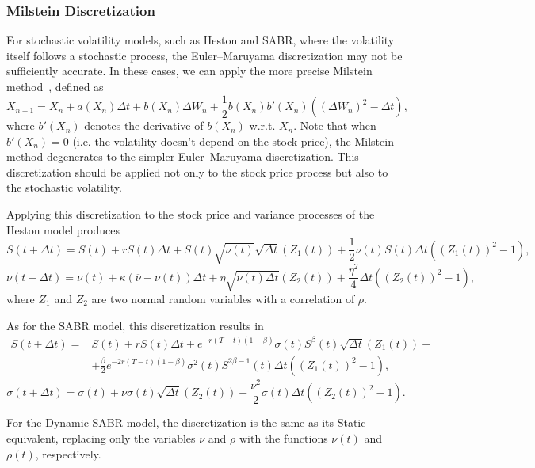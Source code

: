 \subsubsection{Milstein Discretization}
For stochastic volatility models, such as Heston and SABR, where the volatility itself follows a stochastic process, the Euler–Maruyama discretization may not be sufficiently accurate. In these cases, we can apply the more precise Milstein method~\citep{Milstein}, defined as
\begin{equation}
X_{n+1}=X_n+a(X_n)\Delta t+b(X_n)\Delta W_n+\frac{1}{2}b(X_n)b'(X_n)((\Delta W_n)^2-\Delta t),
\end{equation}
\noindent where $b'(X_n)$ denotes the derivative of $b(X_n)$ w.r.t. $X_n$. Note that when $b'(X_n)=0$ (i.e. the volatility doesn't depend on the stock price), the Milstein method degenerates to the simpler Euler–Maruyama discretization. This discretization should be applied not only to the stock price process but also to the stochastic volatility.

Applying this discretization to the stock price and variance processes of the Heston model produces
\begin{equation}\label{milsteinheston1}
S(t+\Delta t)=S(t)+rS(t)\Delta t+S(t)\sqrt{\nu(t)}\sqrt{\Delta t}(Z_1(t))+\frac{1}{2}\nu(t)S(t)\Delta t((Z_1(t))^2-1),
\end{equation}
\begin{equation}
\nu(t+\Delta t)=\nu(t)+\kappa(\overline{\nu}-\nu(t))\Delta t+\eta\sqrt{\nu(t)\Delta t}(Z_2(t))+\frac{\eta^2}{4}\Delta t((Z_2(t))^2-1),
\end{equation}
\noindent where $Z_1$ and $Z_2$ are two normal random variables with a correlation of $\rho$.


As for the SABR model, this discretization results in
\begin{equation}
\begin{split}
S(t+\Delta t)=&S(t)+rS(t)\Delta t+e^{-r(T-t)(1-\beta)}\sigma(t)S^\beta(t)\sqrt{\Delta t}(Z_1(t))+\\
&+\frac{\beta}{2}e^{-2r(T-t)(1-\beta)}\sigma^2(t)S^{2\beta-1}(t)\Delta t((Z_1(t))^2-1),
\end{split}
\end{equation}
\begin{equation}\label{milsteinsabr2}
\sigma(t+\Delta t)=\sigma(t)+\nu\sigma(t)\sqrt{\Delta t}(Z_2(t))+\frac{\nu^2}{2}\sigma(t)\Delta t((Z_2(t))^2-1).
\end{equation}

For the Dynamic SABR model, the discretization is the same as its Static equivalent, replacing only the variables $\nu$ and $\rho$ with the functions $\nu(t)$ and $\rho(t)$, respectively.


